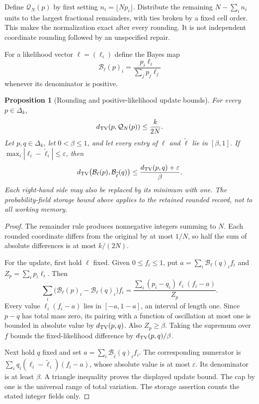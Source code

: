 \documentclass[11pt,letterpaper]{article}
\theoremstyle{plain}
\newtheorem{proposition}[theorem]{Proposition}
\theoremstyle{definition}
\begin{document}
Define $\mathcal Q_N(p)$ by first setting $n_i=\lfloor Np_i\rfloor$. Distribute the remaining $N-\sum_i n_i$ units to the largest fractional remainders, with ties broken by a fixed cell order. This makes the normalization exact after every rounding. It is not independent coordinate rounding followed by an unspecified repair.

For a likelihood vector $\ell=(\ell_i)$ define the Bayes map
\[
 \mathcal B_\ell(p)_i=\frac{p_i\ell_i}{\sum_jp_j\ell_j}
\]
whenever its denominator is positive.

\begin{proposition}[Rounding and positive-likelihood update bounds]\label{prop:roundbayes}
For every $p\in\Delta_k$,
\[
 d_{\mathrm{TV}}(p,\mathcal Q_N(p))\le\frac{k}{2N}.
\]
Let $p,q\in\Delta_k$, let $0<\beta\le1$, and let every entry of $\ell$ and $\widetilde\ell$ lie in $[\beta,1]$. If $\max_i|\ell_i-\widetilde\ell_i|\le\varepsilon$, then
\[
 d_{\mathrm{TV}}\bigl(\mathcal B_\ell(p),\mathcal B_{\widetilde\ell}(q)\bigr)
 \le \frac{d_{\mathrm{TV}}(p,q)+\varepsilon}{\beta}.
\]
Each right-hand side may also be replaced by its minimum with one. The probability-field storage bound above applies to the retained rounded record, not to all working memory.
\end{proposition}
\begin{proof}
The remainder rule produces nonnegative integers summing to $N$. Each rounded coordinate differs from the original by at most $1/N$, so half the sum of absolute differences is at most $k/(2N)$.

For the update, first hold $\ell$ fixed. Given $0\le f_i\le1$, put $a=\sum_i\mathcal B_\ell(q)_if_i$ and $Z_p=\sum_ip_i\ell_i$. Then
\[
 \sum_i\bigl(\mathcal B_\ell(p)_i-\mathcal B_\ell(q)_i\bigr)f_i
 =\frac{\sum_i(p_i-q_i)\ell_i(f_i-a)}{Z_p}.
\]
Every value $\ell_i(f_i-a)$ lies in $[-a,1-a]$, an interval of length one. Since $p-q$ has total mass zero, its pairing with a function of oscillation at most one is bounded in absolute value by $d_{\mathrm{TV}}(p,q)$. Also $Z_p\ge\beta$. Taking the supremum over $f$ bounds the fixed-likelihood difference by $d_{\mathrm{TV}}(p,q)/\beta$.

Next hold $q$ fixed and set $a=\sum_i\mathcal B_{\widetilde\ell}(q)_if_i$. The corresponding numerator is $\sum_iq_i(\ell_i-\widetilde\ell_i)(f_i-a)$, whose absolute value is at most $\varepsilon$. Its denominator is at least $\beta$. A triangle inequality proves the displayed update bound. The cap by one is the universal range of total variation. The storage assertion counts the stated integer fields only.
\end{proof}
\end{document}
